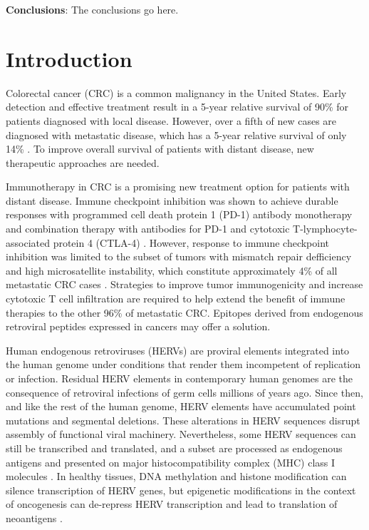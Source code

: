 \documentclass[11pt,letterpaper]{article}
\begin{document}
\textbf{Conclusions}: The conclusions go here.

\newpage
\section*{Introduction}
Colorectal cancer (CRC) is a common malignancy in the United States.
Early detection and effective treatment result in a 5-year relative survival of 90\% for patients diagnosed with local disease.
However, over a fifth of new cases are diagnosed with metastatic disease, which has a 5-year relative survival of only 14\% \citep{SEER2020}.
To improve overall survival of patients with distant disease, new therapeutic approaches are needed.

Immunotherapy in CRC is a promising new treatment option for patients with distant disease.
Immune checkpoint inhibition was shown to achieve durable responses with programmed cell death protein 1 (PD-1) antibody monotherapy and combination therapy with antibodies for PD-1 and cytotoxic T-lymphocyte-associated
protein 4 (CTLA-4) \citep{Le2015, Overman2018}.
However, response to immune checkpoint inhibition was limited to the subset of tumors with mismatch repair defficiency and high microsatellite instability, which constitute approximately 4\% of all metastatic CRC cases \citep{Ganesh2019}.
Strategies to improve tumor immunogenicity and increase cytotoxic T cell infiltration are required to help extend the benefit of immune therapies to the other 96\% of metastatic CRC.
Epitopes derived from endogenous retroviral peptides expressed in cancers may offer a solution.

Human endogenous retroviruses (HERVs) are proviral elements integrated into the human genome under conditions that render them incompetent of replication or infection.
Residual HERV elements in contemporary human genomes are the consequence of retroviral infections of germ cells millions of years ago.
Since then, and like the rest of the human genome, HERV elements have accumulated point mutations and segmental deletions.
These alterations in HERV sequences disrupt assembly of functional viral machinery.
Nevertheless, some HERV sequences can still be transcribed and translated, and a subset are processed as endogenous antigens and presented on major histocompatibility complex (MHC) class I molecules \citep{Boller1997, Rooney2015}.
In healthy tissues, DNA methylation and histone modification can silence transcription of HERV genes, but epigenetic modifications in the context of oncogenesis can de-repress HERV transcription and lead to translation of neoantigens \citep{Menendez2004, Wiesner2015}.
\end{document}
